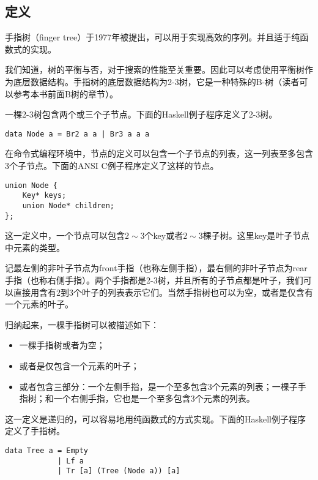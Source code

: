 \documentclass[UTF8]{article}
\begin{document}
\subsection{定义}
手指树（finger tree）\cite{finger-tree-1977}于1977年被提出，可以用于实现高效的序列。并且适于纯函数式的实现\cite{finger-tree-2006}。

我们知道，树的平衡与否，对于搜索的性能至关重要。因此可以考虑使用平衡树作为底层数据结构。手指树的底层数据结构为2-3树，它是一种特殊的B-树（读者可以参考本书前面B树的章节）。

一棵2-3树包含两个或三个子节点。下面的Haskell例子程序定义了2-3树。

\lstset{language=Haskell}
\begin{lstlisting}[style=Haskell]
data Node a = Br2 a a | Br3 a a a
\end{lstlisting}

在命令式编程环境中，节点的定义可以包含一个子节点的列表，这一列表至多包含3个子节点。下面的ANSI C例子程序定义了这样的节点。

\lstset{language=C}
\begin{lstlisting}
union Node {
    Key* keys;
    union Node* children;
};
\end{lstlisting}

这一定义中，一个节点可以包含$2 \sim 3$个key或者$2 \sim 3$棵子树。这里key是叶子节点中元素的类型。

记最左侧的非叶子节点为front手指（也称左侧手指），最右侧的非叶子节点为rear手指（也称右侧手指）。两个手指都是2-3树，并且所有的子节点都是叶子，我们可以直接用含有2到3个叶子的列表表示它们。当然手指树也可以为空，或者是仅含有一个元素的叶子。

归纳起来，一棵手指树可以被描述如下：

\begin{itemize}
\item 一棵手指树或者为空；
\item 或者是仅包含一个元素的叶子；
\item 或者包含三部分：一个左侧手指，是一个至多包含3个元素的列表；一棵子手指树；和一个右侧手指，它也是一个至多包含3个元素的列表。
\end{itemize}

这一定义是递归的，可以容易地用纯函数式的方式实现。下面的Haskell例子程序定义了手指树。

\lstset{language=Haskell}
\begin{lstlisting}[style=Haskell]
data Tree a = Empty
            | Lf a
            | Tr [a] (Tree (Node a)) [a]
\end{lstlisting}
\end{document}
